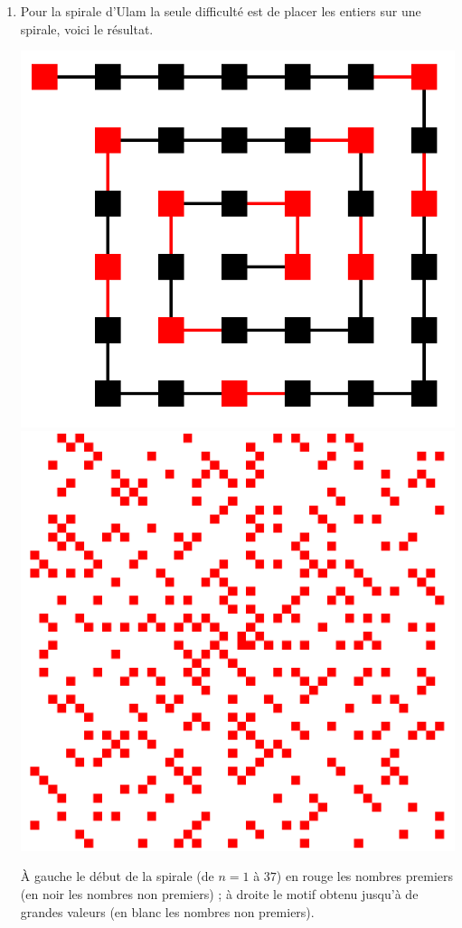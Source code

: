 \documentclass[class=report,crop=false]{standalone}
\begin{document}
\begin{enumerate}
  \item Pour la spirale d'Ulam la seule difficulté est de placer les entiers sur une spirale, voici le résultat.
\begin{center}
\includegraphics[scale=0.3]{figures/ulam1}
\qquad
\includegraphics[scale=0.2]{figures/ulam2}
\end{center}
\`A gauche le début de la spirale (de $n=1$ à $37$) en rouge les nombres premiers (en noir les nombres non premiers) ; à droite le motif obtenu
jusqu'à de grandes valeurs (en blanc les nombres non premiers).

\end{enumerate}
\end{document}
